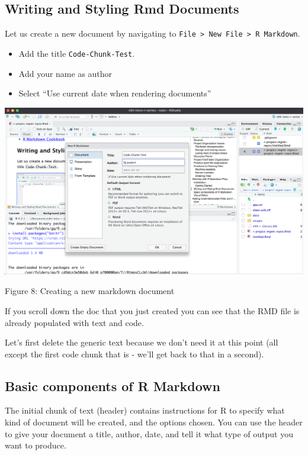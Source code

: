 \documentclass[
]{article}
\begin{document}
\hypertarget{writing-and-styling-rmd-documents}{%
\subsection{Writing and Styling Rmd
Documents}\label{writing-and-styling-rmd-documents}}

Let us create a new document by navigating to
\texttt{File\ \textgreater{}\ New\ File\ \textgreater{}\ R\ Markdown}.

\begin{itemize}
\item
  Add the title \texttt{Code-Chunk-Test}.
\item
  Add your name as author
\item
  Select ``Use current date when rendering documents''
\end{itemize}

\includegraphics[width=6.5in,height=\textheight]{images/02-name-new-rmd.png}

Figure 8: Creating a new markdown document

If you scroll down the doc that you just created you can see that the
RMD file is already populated with text and code.

Let's first delete the generic text because we don't need it at this
point (all except the first code chunk that is - we'll get back to that
in a second).

\hypertarget{basic-components-of-r-markdown}{%
\subsection{Basic components of R
Markdown}\label{basic-components-of-r-markdown}}

The initial chunk of text (header) contains instructions for R to
specify what kind of document will be created, and the options chosen.
You can use the header to give your document a title, author, date, and
tell it what type of output you want to produce.
\end{document}
